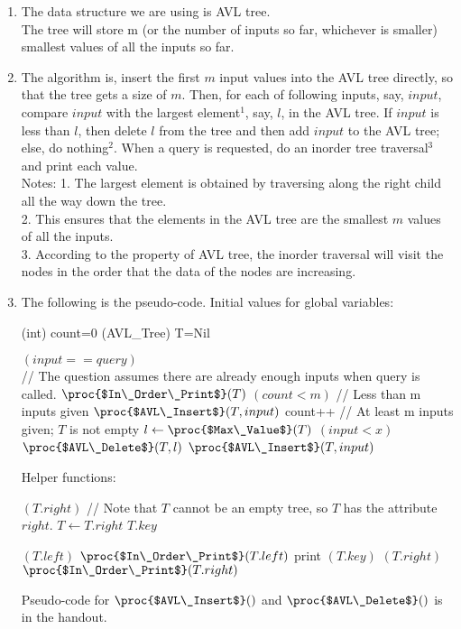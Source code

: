 \documentclass[11pt, answers]{exam}
\theoremstyle{plain}
\theoremstyle{definition}
\begin{document}
\begin{questions}
\question
\begin{solution}
\begin{enumerate}
\item The data structure we are using is AVL tree. \\
The tree will store m (or the number of inputs so far, whichever is smaller) smallest values of all the inputs so far.

\item The algorithm is, insert the first $m$ input values into the AVL tree directly, so that the tree gets a size of $m$. Then, for each of following inputs, say, $input$, compare $input$ with the largest element$^1$, say, $l$, in the AVL tree. If $input$ is less than $l$, then delete $l$ from the tree and then add $input$ to the AVL tree; else, do nothing$^2$. When a query is requested, do an inorder tree traversal$^3$ and print each value.\\
Notes: 
1. The largest element is obtained by traversing along the right child all the way down the tree.\\
2. This ensures that the elements in the AVL tree are the smallest $m$ values of all the inputs. \\
3.  According to the property of AVL tree, the inorder traversal will visit the nodes in the order that the data of the nodes are increasing.\\

\item The following is the pseudo-code.
Initial values for global variables:
\begin{codebox}
\li (int) count=0
\li (AVL\_Tree) T=Nil
\end{codebox}

\begin{codebox}
\li \If $(input == query)$ \\// The question assumes there are already enough inputs when query is called.
\li     \Then $\proc{$In\_Order\_Print$}(T)$
\li     \Else
\li     \If $(count < m)$ // Less than m inputs given
\li         \Then $\proc{$AVL\_Insert$}(T, input)$
\li         count++
\li     \Else // At least m inputs given; $T$ is not empty
\li         $l \gets \proc{$Max\_Value$}(T)$
\li         \If $(input<x)$
\li             \Then $\proc{$AVL\_Delete$}(T, l)$
\li             $\proc{$AVL\_Insert$}(T, input)$
\end{codebox}
Helper functions:
\begin{codebox}
\li \While $(T.right)$ // Note that $T$ cannot be an empty tree, so $T$ has the attribute $right$.
\li     \Do $T \gets T.right$ \End
\li \Return $T.key$
\end{codebox}
\begin{codebox}
\li \If $(T.left)$
\li     \Then $\proc{$In\_Order\_Print$}(T.left)$ \End
\li print $(T.key)$
\li \If $(T.right)$
\li     \Then $\proc{$In\_Order\_Print$}(T.right)$ \End
\end{codebox}
Pseudo-code for $\proc{$AVL\_Insert$}()$ and $\proc{$AVL\_Delete$}()$ is in the handout.


\end{enumerate}
\end{solution}
\end{questions}
\end{document}

